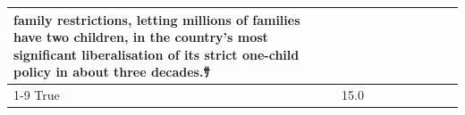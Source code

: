\begin{table}[H]
\begin{tabular}{lllrlllll}
family restrictions, letting millions of families have two children, in the country's most significant liberalisation of its strict one-child policy in about three decades.ｻ \\
\cline{1-9}
True & 15.0%
\end{tabular}
\end{table}
